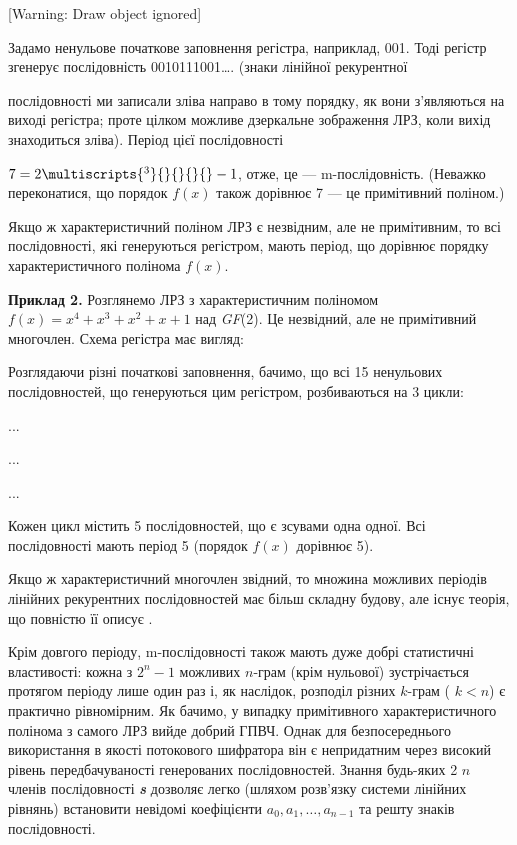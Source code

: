 [Warning: Draw object ignored]

Задамо ненульове початкове заповнення регістра, наприклад, 001. Тоді регістр
згенерує послідовність 0010111001…. (знаки лінійної рекурентної 

послідовності ми записали зліва направо в тому порядку, як вони з’являються на
виході регістра; проте цілком можливе дзеркальне зображення ЛРЗ, коли вихід
знаходиться зліва). Період цієї послідовності 

 ${7=2\multiscripts{^{{3}}}{}{}{\text{}}{}-1}$, отже, це --- m{}-послідовність.
(Неважко переконатися, що порядок  ${f(x)}$ також дорівнює 7 --- це примітивний
поліном.)

Якщо ж характеристичний поліном ЛРЗ є незвідним, але не примітивним, то всі
послідовності, які генеруються регістром, мають період, що дорівнює порядку
характеристичного полінома  ${f(x)}$.

\textbf{Приклад 2.} Розглянемо ЛРЗ з характеристичним поліномом 
${f(x)=x^{{4}}+x^{{3}}+x^{{2}}+x+1}$ над \textit{GF}(2). Це незвідний, але не
примітивний многочлен. Схема регістра має вигляд:

{\par}

Розглядаючи різні початкові заповнення, бачимо, що всі 15 ненульових
послідовностей, що генеруються цим регістром, розбиваються на 3 цикли:

{...
\par}

{...
\par}

{...
\par}

Кожен цикл містить 5 послідовностей, що є зсувами одна одної. Всі послідовності
мають період 5 (порядок  ${f(x)}$ дорівнює 5).

Якщо ж характеристичний многочлен звідний, то множина можливих періодів лінійних
рекурентних послідовностей має більш складну будову, але існує теорія, що
повністю її описує .

Крім довгого періоду, m{}-послідовності також мають дуже добрі статистичні
властивості: кожна з  ${2^{{n}}-1}$ можливих  ${n}${}-грам (крім нульової)
зустрічається протягом періоду лише один раз і, як наслідок, розподіл різних 
${k}${}-грам ( ${k<n}$) є практично рівномірним. Як бачимо, у випадку
примітивного характеристичного полінома з самого ЛРЗ вийде добрий ГПВЧ. Однак
для безпосереднього використання в якості потокового шифратора він є
непридатним через високий рівень передбачуваності генерованих послідовностей.
Знання будь-яких  2 ${n}$ членів послідовності \textbf{\textit{s}} дозволяє
легко (шляхом розв’язку системи лінійних рівнянь) встановити невідомі
коефіцієнти  ${a_{{0}},a_{{1}},\dots,a_{{n-1}}}$ та решту
знаків послідовності.

